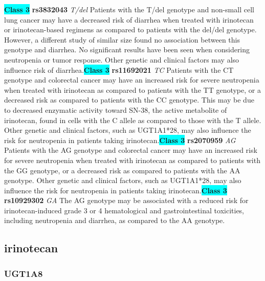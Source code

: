 \documentclass{book}
\begin{document}
\begin{center}
\textbf{\colorbox{cyan} {Class 3}} \textbf{ rs3832043 } \textit{ T/del }
Patients with the T/del genotype and non-small cell lung cancer may have a decreased risk of diarrhea when treated with irinotecan or irinotecan-based regimens as compared to patients with the del/del genotype. However, a different study of similar size found no association between this genotype and diarrhea. No significant results have been seen when considering neutropenia or tumor response. Other genetic and clinical factors may also influence risk of diarrhea.\textbf{\colorbox{cyan} {Class 3}} \textbf{ rs11692021 } \textit{ TC }
Patients with the CT genotype and colorectal cancer may have an increased risk for severe neutropenia when treated with irinotecan as compared to patients with the TT genotype, or a decreased risk as compared to patients with the CC genotype. This may be due to decreased enzymatic activity toward SN-38, the active metabolite of irinotecan, found in cells with the C allele as compared to those with the T allele. Other genetic and clinical factors, such as UGT1A1*28, may also influence the risk for neutropenia in patients taking irinotecan.\textbf{\colorbox{cyan} {Class 3}} \textbf{ rs2070959 } \textit{ AG }
Patients with the AG genotype and colorectal cancer may have an increased risk for severe neutropenia when treated with irinotecan as compared to patients with the GG genotype, or a decreased risk as compared to patients with the AA genotype. Other genetic and clinical factors, such as UGT1A1*28, may also influence the risk for neutropenia in patients taking irinotecan.\textbf{\colorbox{cyan} {Class 3}} \textbf{ rs10929302 } \textit{ GA }
The AG genotype may be associated with a reduced risk for irinotecan-induced grade 3 or 4 hematological and gastrointestinal toxicities, including neutropenia and diarrhea, as compared to the AA genotype. 


\end{center}\subsection{ irinotecan }


\subsubsection{ UGT1A8 }
\end{document}
